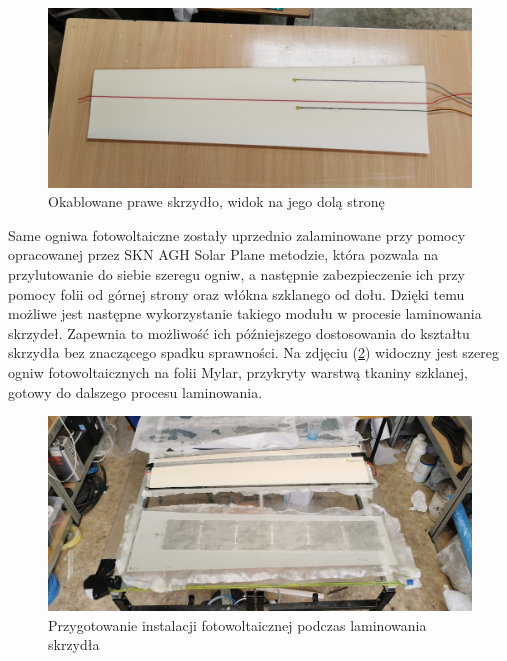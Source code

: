 \documentclass[12pt, a4paper]{article}
\let\oldref\ref
\renewcommand{\ref}[1]{(\oldref{#1})}
\begin{document}
 \begin{figure}[ht]
    \centering
    \includegraphics[width=1\textwidth]{okablowany}
    \caption{Okablowane prawe skrzydło, widok na jego dolą stronę}
    \label{fig:okablowane}
\end{figure}

Same ogniwa fotowoltaiczne zostały uprzednio zalaminowane przy pomocy opracowanej przez SKN AGH Solar Plane metodzie, która pozwala na przylutowanie do siebie szeregu ogniw, a następnie zabezpieczenie ich przy pomocy folii od górnej strony oraz włókna szklanego od dołu. Dzięki temu możliwe jest następne wykorzystanie takiego modułu w procesie laminowania skrzydeł. Zapewnia to możliwość ich późniejszego dostosowania do kształtu skrzydła bez znaczącego spadku sprawności. Na zdjęciu \ref{fig:laminowanie} widoczny jest szereg ogniw fotowoltaicznych na folii Mylar, przykryty warstwą tkaniny szklanej, gotowy do dalszego procesu laminowania.

 \begin{figure}[ht]
    \centering
    \includegraphics[width=1\textwidth]{budowa7}
    \caption{Przygotowanie instalacji fotowoltaicznej podczas laminowania skrzydła}
    \label{fig:laminowanie}
\end{figure}
\end{document}
